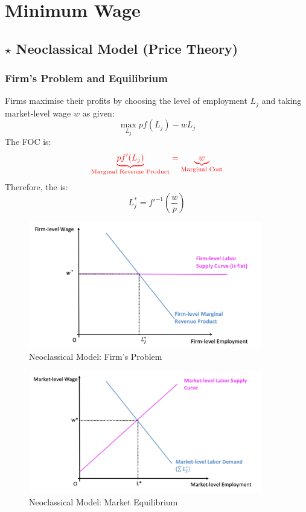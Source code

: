\chapter{Minimum Wage}


\section{$\star$ Neoclassical Model (Price Theory)}

    \subsection{Firm's Problem and Equilibrium}
        Firms maximise their profits by choosing the level of employment $L_j$ and taking market-level wage $w$ as given:
        $$\max_{L_j} pf(L_j) - wL_j$$
        The FOC is:
        $$\color{red} \underbrace{pf'(L_j)}_{\text{Marginal\ Revenue\ Product}} = \underbrace{w}_{\text{Marginal Cost}}$$
        Therefore, the  is:
        $$L_j^*=f'^{-1}\left(\frac{w}{p}\right)$$
        \begin{figure}[H]
            \centering
            \includegraphics[width=4in]{images/ch2/neoclassical_1.png}
            \caption{Neoclassical Model: Firm's Problem}
        \end{figure}
        \begin{figure}[H]
            \centering
            \includegraphics[width=4in]{images/ch2/neoclassical_2.png}
            \caption{Neoclassical Model: Market Equilibrium}
        \end{figure}
        
